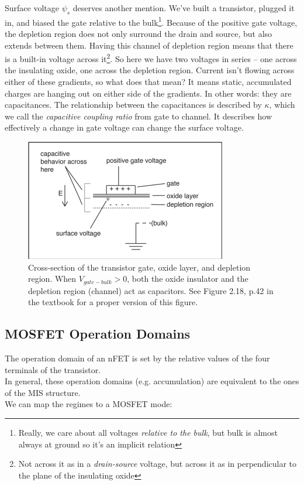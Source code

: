 Surface voltage $\psi_s$ deserves another mention. We've built a transistor, plugged it in, and biased the gate relative to the bulk\footnote{Really, we care about all voltages \emph{relative to the bulk}, but bulk is almost always at ground so it's an implicit relation}. Because of the positive gate voltage, the depletion region does not only surround the drain and source, but also extends between them. Having this channel of depletion region means that there is a built-in voltage across it\footnote{Not across it as in a \emph{drain-source} voltage, but across it as in perpendicular to the plane of the insulating oxide}. So here we have two voltages in series – one across the insulating oxide, one across the depletion region. Current isn't flowing across either of these gradients, so what does that mean? It means static, accumulated charges are hanging out on either side of the gradients. In other words: they are capacitances. The relationship between the capacitances is described by $\kappa$, which we call the \textsl{capacitive coupling ratio} from gate to channel. It describes how effectively a change in gate voltage can change the surface voltage.
\begin{figure}[hb]
 \centering
\includegraphics[natwidth=663,natheight=400]{pics/nme_xSection.pdf}
\caption{Cross-section of the transistor gate, oxide layer, and depletion region. When $V_{gate-bulk} > 0$, both the oxide insulator and the depletion region (channel) act as capacitors. See Figure 2.18, p.42 in the textbook for a proper version of this figure.\label{crossSectionCaps}}
\end{figure}

\subsection{MOSFET Operation Domains}
The operation domain of an nFET is set by the relative values of the four terminals of the transistor.\\
In general, these operation domains (e.g. accumulation) are equivalent to the ones of the MIS structure.\\
We can map the regimes to a MOSFET mode:



